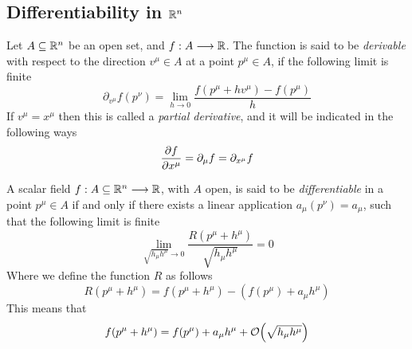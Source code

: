 \documentclass[../complete.tex]{subfiles}
\begin{document}
\subsection{Differentiability in $\mathbb{R}^n$}
\begin{dfn}
	Let $A\subseteq\mathbb{R}^n$ be an open set, and $f:A\overset{}{\longrightarrow}\mathbb{R}$. The function is said to be \textit{derivable} with respect to the direction $v^\mu\in A$ at a point $p^\mu\in A$, if the following limit is finite
	\begin{equation}
		\partial_{v^\mu}f(p^\nu)=\lim_{h\to0}\frac{f(p^\mu+hv^\mu)-f(p^\mu)}{h}
		\label{eq:directionalder}
	\end{equation}
	If $v^\mu=x^\mu$ then this is called a \textit{partial derivative}, and it will be indicated in the following ways
	\begin{equation}
		\pdv{f}{x^\mu}=\partial_\mu f=\partial_{x^\mu}f
		\label{eq:partialdernot}
	\end{equation}
\end{dfn}
\begin{dfn}[Differentiability]
	A scalar field $f:A\subseteq\mathbb{R}^n\overset{}{\longrightarrow}\mathbb{R}$, with $A$ open, is said to be \textit{differentiable} in a point $p^\mu\in A$ if and only if there exists a linear application $a_\mu(p^\nu)=a_\mu$, such that the following limit is finite
	\begin{equation}
		\lim_{\sqrt{h_\mu h^\mu}\to0}\frac{R(p^\mu+h^\mu)}{\sqrt{h_\mu h^\mu}}=0
		\label{eq:limitrest}
	\end{equation}
	Where we define the function $R$ as follows
	\begin{equation}
		R(p^\mu+h^\mu)=f(p^\mu+h^\mu)-\left( f(p^\mu)+a_\mu h^\mu \right)
		\label{eq:restfunc}
	\end{equation}
	This means that
	\begin{equation}
		f(p^\mu+h^\mu)=f(p^\mu)+a_\mu h^\mu+\order{\sqrt{h_\mu h^\mu}}
		\label{eq:diff}
	\end{equation}
\end{dfn}
\end{document}
